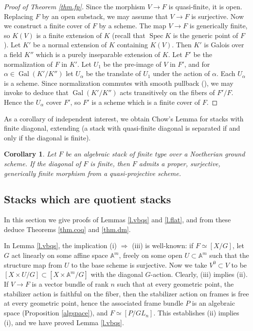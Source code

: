 \documentclass[12pt]{amsart}
\newcommand{\A}{{\mathbb A}}
\DeclareMathOperator{\spec}{Spec}
\DeclareMathOperator{\Gal}{Gal}
\theoremstyle{plain}
\newtheorem  {cor}  [thm] {Corollary}
\theoremstyle{definition}
\theoremstyle{remark}
\begin{document}
\begin{proof}[Proof of Theorem \ref{thm.fp}]
Since the morphism $V \rightarrow F$ is quasi-finite, it is open.
Replacing $F$ by an open substack, we may assume that $V\rightarrow F$
is surjective.
Now we construct a finite cover of $F$ by a scheme.
The map $V \rightarrow F$ is generically
finite, so $K(V)$ is a finite extension of $K$ (recall that
$\spec K$ is the generic point of $F$). Let
$K'$ be a normal extension of $K$ containing $K(V)$.
Then $K'$ is Galois over a field $K''$ which is a purely
inseparable extension of $K$.
Let $F'$ be the normalization of $F$ in $K'$.
Let $U_1$ be the pre-image of $V$ in $F'$,
and for $\alpha\in \Gal(K'/K'')$ let $U_\alpha$ be the translate
of $U_1$ under the action of $\alpha$.
Each $U_\alpha$ is a scheme.
Since normalization commutes with smooth pullback
(\cite[Lemma 16.2.1]{L-MB}),
we may invoke \cite[Prop.\ V2.3.6]{Bourbaki}
to deduce that
$\Gal(K'/K'')$ acts 
transitively on the fibers of $F'/F$.
Hence the $U_\alpha$ cover $F'$, so $F'$ is a scheme which is a finite
cover of $F$.
\end{proof}

As a corollary of independent interest, we obtain Chow's Lemma for 
stacks with finite diagonal, extending \cite[Theorem 4.12]{D-M}
(a stack with quasi-finite diagonal is separated if and only
if the diagonal is finite).
\begin{cor} \label{c.chow}
Let $F$ be an algebraic stack of finite type over a Noetherian ground scheme.
If the diagonal of $F$ is finite,
then $F$ admits a proper, surjective, generically
finite morphism from a quasi-projective scheme.
\end{cor}

\subsection{Stacks which are quotient stacks}
In this section we give proofs of Lemmas \ref{l.vbqs} and \ref{l.flat},
and from these deduce Theorems \ref{thm.coq} and \ref{thm.dm}.

In Lemma \ref{l.vbqs}, the implication (i) $\Rightarrow$ (iii)
is well-known: if $F\simeq[X/G]$, let $G$ act linearly
on some affine space $\A^m$, freely on some open $U\subset \A^m$ such
that the structure map from $U$ to the base scheme is surjective.
Now we take $V^0\subset V$ to be $[X\times U/G]\subset[X\times \A^m/G]$
with the diagonal $G$-action.
Clearly, (iii) implies (ii).
If $V\to F$ is a vector bundle of rank $n$ such that at every geometric point,
the stabilizer action is faithful on the fiber,
then the stabilizer action on frames is free at every geometric point,
hence the associated frame bundle $P$ is
an algebraic space (Proposition \ref{algspace}),
and $F\simeq[P/GL_n]$.
This establishes (ii) implies (i), and we have proved Lemma \ref{l.vbqs}.
\end{document}
